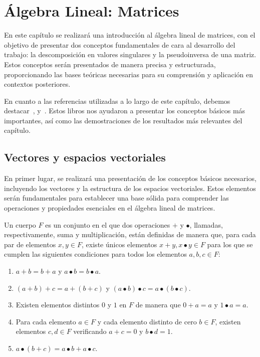 \chapter{Álgebra Lineal: Matrices}\label{ch:capitulo-algebral-lineal:matrices}

En este capítulo se realizará una introducción al álgebra lineal de matrices, con el objetivo de presentar dos conceptos fundamentales de cara al desarrollo del trabajo: la descomposición en valores singulares y la pseudoinversa de una matriz. Estos conceptos serán presentados de manera precisa y estructurada, proporcionando las bases teóricas necesarias para su comprensión y aplicación en contextos posteriores.\newline

En cuanto a las referencias utilizadas a lo largo de este capítulo, debemos destacar~\cite{Friedberg2014linear}, \cite{Strang2023} y~\cite{Poole2011}. Estos libros nos ayudaron a presentar los conceptos básicos más importantes, así como las demostraciones de los resultados más relevantes del capítulo.

\section{Vectores y espacios vectoriales}\label{sec:vectores-y-espacios-vectoriales}

En primer lugar, se realizará una presentación de los conceptos básicos necesarios, incluyendo los vectores y la estructura de los espacios vectoriales. Estos elementos serán fundamentales para establecer una base sólida para comprender las operaciones y propiedades esenciales en el álgebra lineal de matrices.\newline

\begin{definicion}
    Un cuerpo $F$ es un conjunto en el que dos operaciones $+$ y $\bullet$, llamadas, respectivamente, suma y multiplicación, están definidas de manera que, para cada par de elementos $x, y \in F$, existe únicos elementos $x + y, x \bullet y \in F$ para los que se cumplen las siguientes condiciones para todos los elementos $a, b, c \in F$:

    \begin{enumerate}
        \item $a + b = b + a$ \space y \space $a \bullet b = b \bullet a$.
        \item $(a+b)+c=a+(b+c)$ \space y \space $(a \bullet b) \bullet c=a \bullet (b \bullet c)$.
        \item Existen elementos distintos $0$ y $1$ en $F$ de manera que $0 + a = a$ \space y \space $1 \bullet a = a$.
        \item Para cada elemento $a \in F$ y cada elemento distinto de cero $b \in F$, existen elementos $c, d \in F$ verificando $a+c=0$ \space y \space $b \bullet d = 1$.
        \item $a \bullet (b+c) = a \bullet b + a \bullet c$.
    \end{enumerate}
\end{definicion}


